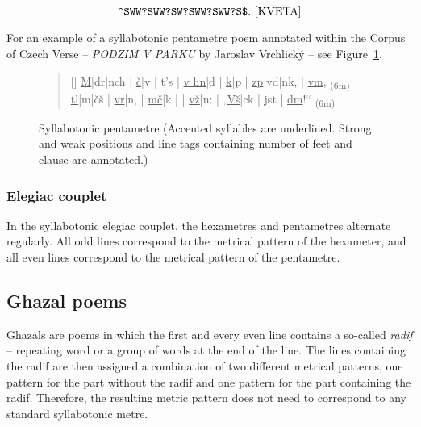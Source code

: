 \begin{equation}\label{eq:pentametre-regex}
        \verb|^SWW?SWW?SW?SWW?SWW?S$|.\text{ \cite{KVETA}}
\end{equation}

For an example of a syllabotonic pentametre poem  annotated within the Corpus of Czech Verse -- \emph{PODZIM V PARKU} by Jaroslav Vrchlický -- see Figure~\ref{fig:syllabotonic-pentametre}.~\cite{GitCorpusCzechVerse}

\begin{figure}[htpb]
    \centering
    \begin{verse}[\versewidth]
    \uline{M}|dr|nch | \uline{č}|v | t’s | \uline{v hn}|d | \uline{k}|p | \uline{zp}|vd|nk, | \uline{vm}, \textsubscript{(6m)}\\
    \uline{tl}|m|čš | \uline{vr}|n, | \uline{mč}|k |  | \uline{vž}|n: | „\uline{Vš}|ck | jst | \uline{dm}!“ \textsubscript{(6m)}
    \end{verse}
    \caption[Syllabotonic pentametre]{Syllabotonic pentametre (Accented syllables are underlined. Strong and weak positions and line tags containing number of feet and clause are annotated.)}\label{fig:syllabotonic-pentametre}
\end{figure}

\subsubsection{Elegiac couplet}
In the syllabotonic elegiac couplet, the hexametres and pentametres alternate regularly. All odd lines correspond to the metrical pattern of the hexameter, and all even lines correspond to the metrical pattern of the pentametre.~\cite{KVETA}

\subsection{Ghazal poems}
Ghazals are poems in which the first and every even line contains a so-called \emph{radif} -- repeating word or a group of words at the end of the line. The lines containing the radif are then assigned a combination of two different metrical patterns, one pattern for the part without the radif and one pattern for the part containing the radif. Therefore, the resulting metric pattern does not need to correspond to any standard syllabotonic metre.~\cite{KVETA}


